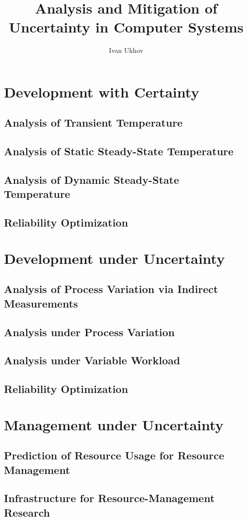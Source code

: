 \documentclass[english]{style}
\title{
  Analysis and Mitigation of\\[0.3em]
  Uncertainty in Computer Systems
}
\author{Ivan Ukhov}
\begin{document}
\nocite{ukhov2012, ukhov2014a, ukhov2014b, ukhov2015, ukhov2017}



\chapter{Development with Certainty}
\section{Analysis of Transient Temperature}
\section{Analysis of Static Steady-State Temperature}
\section{Analysis of Dynamic Steady-State Temperature}
\section{Reliability Optimization}

\chapter{Development under Uncertainty}
\section{Analysis of Process Variation via Indirect Measurements}
\section{Analysis under Process Variation}
\section{Analysis under Variable Workload}
\section{Reliability Optimization}

\chapter{Management under Uncertainty}
\section{Prediction of Resource Usage for Resource Management}
\section{Infrastructure for Resource-Management Research}



\printbibliography
\end{document}
